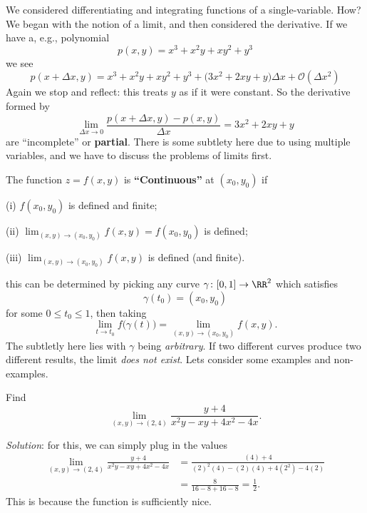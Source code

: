 \M
We considered differentiating and integrating functions of a
single-variable. How? We began with the notion of a limit, and
then considered the derivative. If we have a, e.g., polynomial
\begin{equation}
p(x,y) = x^{3}+x^{2}y+xy^{2}+y^{3}
\end{equation}
we see
\begin{equation}
p(x+\Delta x,y) = x^{3}+x^{2}y+xy^{2}+y^{3}+\bigl(3x^{2}+2xy+y\bigr)\Delta x+
\mathcal{O}(\Delta x^{2})
\end{equation}
Again we stop and reflect: this treats $y$ as if it were
constant. So the derivative formed by
\begin{equation}
\lim_{\Delta x\to0}\frac{p(x+\Delta x,y)-p(x,y)}{\Delta x}=3x^{2}+2xy+y
\end{equation}
are ``incomplete'' or \textbf{partial}. There is some subtlety
here due to using multiple variables, and we have to discuss the
problems of limits first.\more

The function $z=f(x,y)$ is \textbf{``Continuous''} at
$(x_{0},y_{0})$ if

(i) $f(x_{0},y_{0})$ is defined and finite;

(ii) $\displaystyle\lim_{(x,y)\to(x_{0},y_{0})}f(x,y)=f(x_{0},y_{0})$ is
defined;

(iii) $\displaystyle\lim_{(x,y)\to(x_{0},y_{0})}f(x,y)$ is defined (and finite).

 this can be determined by picking any curve
$\gamma\colon[0,1]\to\RR^{2}$ which satisfies
\begin{equation}
\gamma(t_{0}) = (x_{0},y_{0})
\end{equation}
for some $0\leq t_{0}\leq 1$, then taking 
\begin{equation}
\lim_{t\to t_{0}}f\bigl(\gamma(t)\bigr) = \lim_{(x,y)\to(x_{0},y_{0})}f(x,y).
\end{equation}
The subtletly here lies with $\gamma$ being \emph{arbitrary}. If
two different curves produce two different results, the limit
\emph{does not exist}. Lets consider some examples and non-examples.

\begin{example}
Find
\begin{equation}
\lim_{(x,y)\to(2,4)}\frac{y+4}{x^{2}y-xy+4x^{2}-4x}.
\end{equation}

\emph{Solution}: for this, we can simply plug in the values
\begin{equation}
\begin{aligned}
\lim_{(x,y)\to(2,4)}\frac{y+4}{x^{2}y-xy+4x^{2}-4x}
&=\frac{(4)+4}{(2)^{2}(4)-(2)(4)+4(2^{2})-4(2)}\\
&=\frac{8}{16-8+16-8}=\frac{1}{2}.
\end{aligned}
\end{equation}
This is because the function is sufficiently nice.
\end{example}

